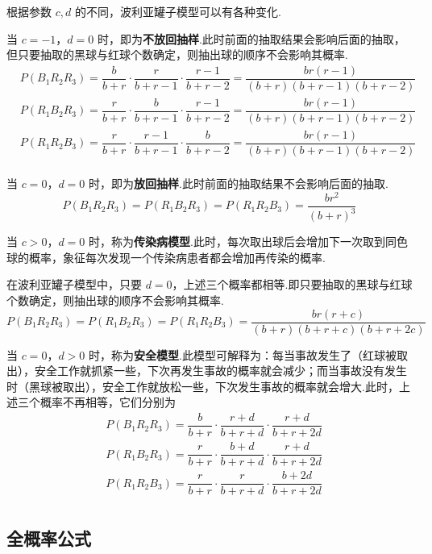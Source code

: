 \begin{note}
    \indent 根据参数 $c,d$ 的不同，波利亚罐子模型可以有各种变化.

    当 $c=-1$，$d=0$ 时，即为\textbf{不放回抽样}.此时前面的抽取结果会影响后面的抽取，但只要抽取的黑球与红球个数确定，则抽出球的顺序不会影响其概率.
    $$
    \begin{aligned}
        & P(B_1 R_2 R_3) = \dfrac{b}{b+r} \cdot \dfrac{r}{b+r-1} \cdot \dfrac{r-1}{b+r-2} = \dfrac{br(r-1)}{(b+r)(b+r-1)(b+r-2)} \\
        & P(R_1 B_2 R_3) = \dfrac{r}{b+r} \cdot \dfrac{b}{b+r-1} \cdot \dfrac{r-1}{b+r-2} = \dfrac{br(r-1)}{(b+r)(b+r-1)(b+r-2)} \\
        & P(R_1 R_2 B_3) = \dfrac{r}{b+r} \cdot \dfrac{r-1}{b+r-1} \cdot \dfrac{b}{b+r-2} = \dfrac{br(r-1)}{(b+r)(b+r-1)(b+r-2)} \\
    \end{aligned}
    $$

    当 $c=0$，$d=0$ 时，即为\textbf{放回抽样}.此时前面的抽取结果不会影响后面的抽取.
    $$
    P(B_1 R_2 R_3) = P(R_1 B_2 R_3) = P(R_1 R_2 B_3) = \dfrac{br^2}{(b+r)^3}
    $$

    当 $c>0$，$d=0$ 时，称为\textbf{传染病模型}.此时，每次取出球后会增加下一次取到同色球的概率，象征每次发现一个传染病患者都会增加再传染的概率.

    在波利亚罐子模型中，只要 $d=0$，上述三个概率都相等.即只要抽取的黑球与红球个数确定，则抽出球的顺序不会影响其概率.
    $$
    P(B_1 R_2 R_3) = P(R_1 B_2 R_3) = P(R_1 R_2 B_3) = \dfrac{br(r+c)}{(b+r)(b+r+c)(b+r+2c)}
    $$

    当 $c=0$，$d>0$ 时，称为\textbf{安全模型}.此模型可解释为：每当事故发生了（红球被取出），安全工作就抓紧一些，下次再发生事故的概率就会减少；而当事故没有发生时（黑球被取出），安全工作就放松一些，下次发生事故的概率就会增大.此时，上述三个概率不再相等，它们分别为
    $$
    \begin{aligned}
        & P(B_1 R_2 R_3) = \dfrac{b}{b+r} \cdot \dfrac{r+d}{b+r+d} \cdot \dfrac{r+d}{b+r+2d} \\
        & P(R_1 B_2 R_3) = \dfrac{r}{b+r} \cdot \dfrac{b+d}{b+r+d} \cdot \dfrac{r+d}{b+r+2d} \\
        & P(R_1 R_2 B_3) = \dfrac{r}{b+r} \cdot \dfrac{r}{b+r+d} \cdot \dfrac{b+2d}{b+r+2d} \\
    \end{aligned}
    $$
\end{note}

\subsection{全概率公式}

